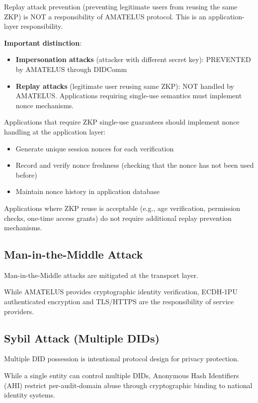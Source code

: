 \begin{proposition}
  \label{prop:replay-application-layer}
  Replay attack prevention (preventing legitimate users from reusing the same ZKP) is NOT
  a responsibility of AMATELUS protocol. This is an application-layer responsibility.

  \textbf{Important distinction}:
  \begin{itemize}
    \item \textbf{Impersonation attacks} (attacker with different secret key):
      PREVENTED by AMATELUS through DIDComm
    \item \textbf{Replay attacks} (legitimate user reusing same ZKP):
      NOT handled by AMATELUS. Applications requiring single-use semantics must implement nonce mechanisms.
  \end{itemize}

  Applications that require ZKP single-use guarantees should implement nonce handling at the application layer:
  \begin{itemize}
    \item Generate unique session nonces for each verification
    \item Record and verify nonce freshness (checking that the nonce has not been used before)
    \item Maintain nonce history in application database
  \end{itemize}

  Applications where ZKP reuse is acceptable (e.g., age verification, permission checks, one-time access grants)
  do not require additional replay prevention mechanisms.
\end{proposition}

\subsection{Man-in-the-Middle Attack}

\begin{proposition}
  \label{prop:mitm-defense}
  Man-in-the-Middle attacks are mitigated at the transport layer.

  While AMATELUS provides cryptographic identity verification, ECDH-1PU authenticated
  encryption and TLS/HTTPS are the responsibility of service providers.
\end{proposition}

\subsection{Sybil Attack (Multiple DIDs)}

\begin{proposition}
  \label{prop:sybil-resilience}
  Multiple DID possession is intentional protocol design for privacy protection.

  While a single entity can control multiple DIDs, Anonymous Hash Identifiers (AHI)
  restrict per-audit-domain abuse through cryptographic binding to national identity systems.
\end{proposition}

